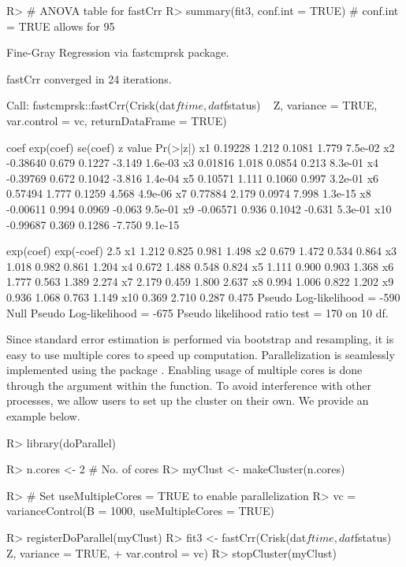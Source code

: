 \begin{example}
R> # ANOVA table for fastCrr
R> summary(fit3, conf.int = TRUE) # conf.int = TRUE allows for 95%

Fine-Gray Regression via fastcmprsk package. 

fastCrr converged in 24 iterations.
 
Call:
fastcmprsk::fastCrr(Crisk(dat$ftime, dat$fstatus) ~ Z, variance = TRUE, 
    var.control = vc, returnDataFrame = TRUE)

        coef exp(coef) se(coef) z value Pr(>|z|)
x1   0.19228     1.212   0.1081   1.779  7.5e-02
x2  -0.38640     0.679   0.1227  -3.149  1.6e-03
x3   0.01816     1.018   0.0854   0.213  8.3e-01
x4  -0.39769     0.672   0.1042  -3.816  1.4e-04
x5   0.10571     1.111   0.1060   0.997  3.2e-01
x6   0.57494     1.777   0.1259   4.568  4.9e-06
x7   0.77884     2.179   0.0974   7.998  1.3e-15
x8  -0.00611     0.994   0.0969  -0.063  9.5e-01
x9  -0.06571     0.936   0.1042  -0.631  5.3e-01
x10 -0.99687     0.369   0.1286  -7.750  9.1e-15

    exp(coef) exp(-coef)  2.5%
x1      1.212      0.825 0.981 1.498
x2      0.679      1.472 0.534 0.864
x3      1.018      0.982 0.861 1.204
x4      0.672      1.488 0.548 0.824
x5      1.111      0.900 0.903 1.368
x6      1.777      0.563 1.389 2.274
x7      2.179      0.459 1.800 2.637
x8      0.994      1.006 0.822 1.202
x9      0.936      1.068 0.763 1.149
x10     0.369      2.710 0.287 0.475
Pseudo Log-likelihood = -590 
Null Pseudo Log-likelihood = -675 
Pseudo likelihood ratio test = 170 on 10 df. 
\end{example}



Since standard error estimation is performed via bootstrap and resampling, it is easy to use multiple cores to speed up computation. Parallelization is seamlessly implemented using the  package \citep{doParallel}. Enabling usage of multiple cores is done through the  argument within the  function. To avoid interference with other processes, we allow users to set up the cluster on their own. We provide an example below.

\begin{example}
R> library(doParallel) 

R> n.cores <- 2 # No. of cores
R> myClust <- makeCluster(n.cores)

R> # Set useMultipleCores = TRUE to enable parallelization
R> vc = varianceControl(B = 1000, useMultipleCores = TRUE)

R> registerDoParallel(myClust)
R> fit3 <- fastCrr(Crisk(dat$ftime, dat$fstatus) ~ Z, variance = TRUE,
+                             var.control = vc)
R> stopCluster(myClust)
\end{example}



